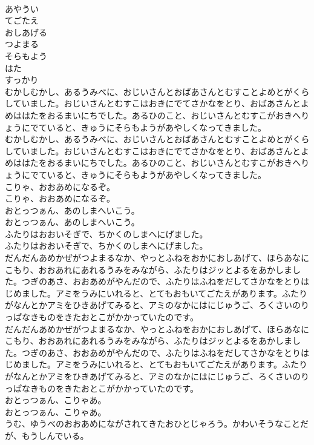 \documentclass[8pt]{extreport}
\begin{document}
\begin{CJK}{UTF8}{min}
\\	あやうい
\\	てごたえ
\\	おしあげる
\\	つよまる
\\	そらもよう
\\	はた
\\	すっかり
\\	むかしむかし、あるうみべに、おじいさんとおばあさんとむすことよめとがくらしていました。おじいさんとむすこはおきにでてさかなをとり、おばあさんとよめははたをおるまいにちでした。あるひのこと、おじいさんとむすこがおきへりょうにでていると、きゅうにそらもようがあやしくなってきました。
\\	むかしむかし、あるうみべに、おじいさんとおばあさんとむすことよめとがくらしていました。おじいさんとむすこはおきにでてさかなをとり、おばあさんとよめははたをおるまいにちでした。あるひのこと、おじいさんとむすこがおきへりょうにでていると、きゅうにそらもようがあやしくなってきました。
\\	こりゃ、おおあめになるぞ。
\\	こりゃ、おおあめになるぞ。
\\	おとっつぁん、あのしまへいこう。
\\	おとっつぁん、あのしまへいこう。
\\	ふたりはおおいそぎで、ちかくのしまへにげました。
\\	ふたりはおおいそぎで、ちかくのしまへにげました。
\\	だんだんあめかぜがつよまるなか、やっとふねをおかにおしあげて、ほらあなにこもり、おおあれにあれるうみをみながら、ふたりはジッとよるをあかしました。つぎのあさ、おおあめがやんだので、ふたりはふねをだしてさかなをとりはじめました。アミをうみにいれると、とてもおもいてごたえがあります。ふたりがなんとかアミをひきあげてみると、アミのなかにはにじゅうご、ろくさいのりっぱなきものをきたおとこがかかっていたのです。
\\	だんだんあめかぜがつよまるなか、やっとふねをおかにおしあげて、ほらあなにこもり、おおあれにあれるうみをみながら、ふたりはジッとよるをあかしました。つぎのあさ、おおあめがやんだので、ふたりはふねをだしてさかなをとりはじめました。アミをうみにいれると、とてもおもいてごたえがあります。ふたりがなんとかアミをひきあげてみると、アミのなかにはにじゅうご、ろくさいのりっぱなきものをきたおとこがかかっていたのです。
\\	おとっつぁん、こりゃあ。
\\	おとっつぁん、こりゃあ。
\\	うむ、ゆうべのおおあめにながされてきたおひとじゃろう。かわいそうなことだが、もうしんでいる。

\end{CJK}
\end{document}
